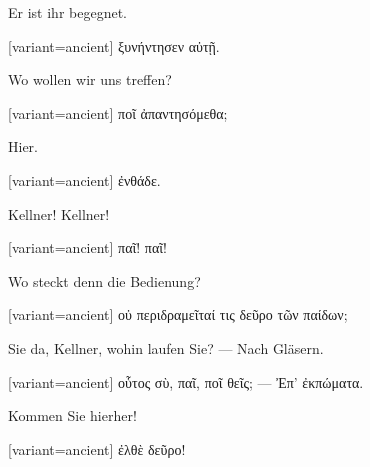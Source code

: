 Er ist ihr begegnet.

\switchcolumn

\begin{greek}[variant=ancient]%
ξυνήντησεν αὐτῇ.

\end{greek}%
\switchcolumn*

Wo wollen wir uns treffen?

\switchcolumn

\begin{greek}[variant=ancient]%
ποῖ ἀπαντησόμεθα;

\end{greek}%
\switchcolumn*

Hier.

\switchcolumn

\begin{greek}[variant=ancient]%
ἐνθάδε.

\end{greek}%
\indent Kellner! Kellner!

\switchcolumn

\begin{greek}[variant=ancient]%
παῖ! παῖ!

\end{greek}%
\switchcolumn*

Wo steckt denn die Bedienung?

\switchcolumn

\begin{greek}[variant=ancient]%
οὐ περιδραμεῖταί τις δεῦρο τῶν παίδων;

\end{greek}%
\switchcolumn*

Sie da, Kellner, wohin laufen Sie? --- Nach Gläsern.

\switchcolumn

\begin{greek}[variant=ancient]%
οὗτος σὺ, παῖ, ποῖ θεῖς; --- Ἐπ' ἐκπώματα.

\end{greek}%
\switchcolumn*

Kommen Sie hierher!

\switchcolumn

\begin{greek}[variant=ancient]%
ἐλθὲ δεῦρο!

\end{greek}%
\switchcolumn*

